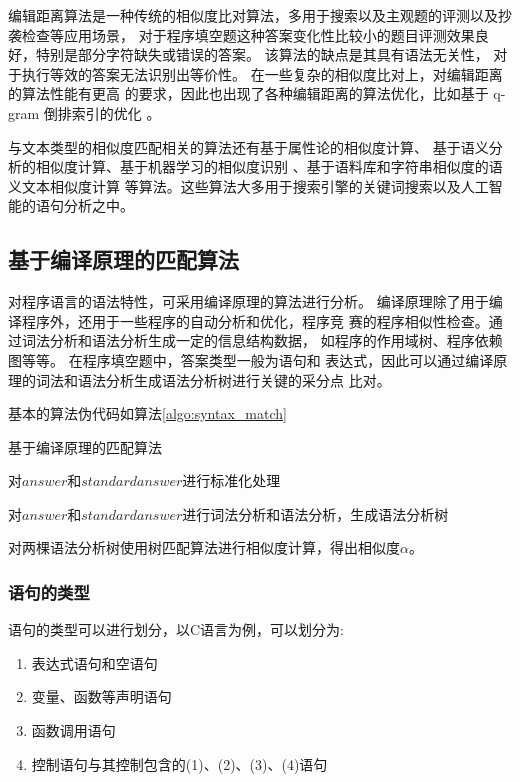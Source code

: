 编辑距离算法是一种传统的相似度比对算法，多用于搜索以及主观题的评测以及抄袭检查等应用场景，
对于程序填空题这种答案变化性比较小的题目评测效果良好，特别是部分字符缺失或错误的答案。
该算法的缺点是其具有语法无关性，
对于执行等效的答案无法识别出等价性。
在一些复杂的相似度比对上，对编辑距离的算法性能有更高
的要求，因此也出现了各种编辑距离的算法优化，比如基于 q-gram 倒排索引的优化
\cite{wangjinbao2015}。

与文本类型的相似度匹配相关的算法还有基于属性论的相似度计算\cite{panqianhong1999}、
基于语义分析的相似度计算\cite{Mihalcea2006Corpus}、基于机器学习的相似度识别\cite{Bilenko2003Adaptive}
、基于语料库和字符串相似度的语义文本相似度计算\cite{islam2008semantic_24}\cite{mihalcea2006corpus_25}
等算法。这些算法大多用于搜索引擎的关键词搜索以及人工智能的语句分析之中。

\subsection{基于编译原理的匹配算法}
对程序语言的语法特性，可采用编译原理的算法进行分析。
编译原理除了用于编译程序外，还用于一些程序的自动分析和优化，程序竞
赛的程序相似性检查\cite{Whale1990Identification}。通过词法分析和语法分析生成一定的信息结构数据，
如程序的作用域树\cite{Colin2002Scope}、程序依赖图\cite{Krinke2001Identifying}等等。
在程序填空题中，答案类型一般为语句和
表达式，因此可以通过编译原理的词法和语法分析生成语法分析树进行关键的采分点
比对\cite{wang1994system_17}。

基本的算法伪代码如算法\ref{algo:syntax_match}

\begin{algorithm}[h]
	\caption{基于编译原理的匹配算法}
	\label{algo:syntax_match}
	对$answer$和$standardanswer$进行标准化处理

  对$answer$和$standardanswer$进行词法分析和语法分析，生成语法分析树

	对两棵语法分析树使用树匹配算法进行相似度计算，得出相似度$\alpha$。
\end{algorithm}

\subsubsection{语句的类型}
语句的类型可以进行划分，以C语言为例，可以划分为:
\begin{enumerate}
  \item 表达式语句和空语句
  \item 变量、函数等声明语句
  \item 函数调用语句
  \item 控制语句与其控制包含的(1)、(2)、(3)、(4)语句
\end{enumerate}

